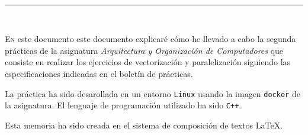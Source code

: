 
\begin{center}
	{\fboxrule=4pt } \\
	\rule{15cm}{0pt} \\
\end{center}

 
 \lettrine[lines=3, depth = 0]{E}{n} este documento este documento explicaré cómo he llevado a 
 cabo la segunda prácticas de la asignatura \textit{Arquitectura y Organización de Computadores} que 
 consiste en realizar los ejercicios de vectorización y paralelización siguiendo las 
 especificaciones indicadas en el boletín de prácticas.
 
 \par La práctica ha sido desarollada en un entorno \texttt{Linux} usando la imagen \texttt{docker} de la asignatura. El lenguaje de
 programación utilizado ha sido \texttt{C++}. 

 \par Esta memoria ha sido creada en el sistema de composición de textos \LaTeX.


\newpage
{}